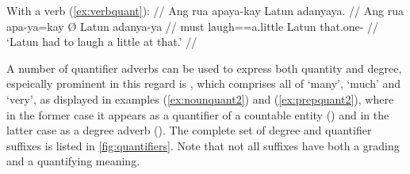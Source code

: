 \a\label{ex:verbquant2}\begingl
	\glpreamble With a verb (\ref{ex:verbquant}): //
	\gla Ang rua apaya-kay {} Latun adanyaya. //
	\glb Ang rua apa-ya=kay Ø Latun adanya-ya //
	\glc \AgtT{} must laugh=\TsgM{}=a.little \Top{} Latun that.one-\Loc{} //
	\glft `Latun had to laugh a little at that.' //
\endgl

\xe

A number of quantifier adverbs can be used to express both quantity and 
degree, espeically prominent in this regard is , which 
comprises all of `many', `much' and `very', as displayed in examples 
(\ref{ex:nounquant2}) and (\ref{ex:prepquant2}), where in the former case it 
appears as a quantifier of a countable entity 
() and in the latter case as a 
degree adverb (). The complete set of 
degree and quantifier suffixes is listed in \autoref{fig:quantifiers}. Note 
that not all suffixes have both a grading and a quantifying meaning.

